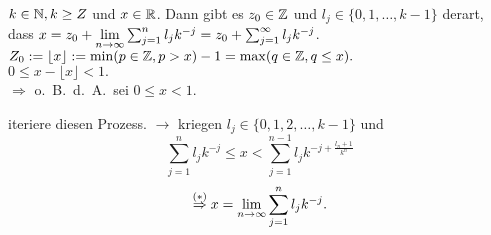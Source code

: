 \documentclass[../ana1.tex]{subfiles}
\begin{document}
\begin{satz}
	\(k\in\mathbb{N}, k\geq Z\) und \(x\in\mathbb{R} \). Dann gibt es \(z_0\in \mathbb{Z} \) und \(l_j \in \{0,1,\ldots,k-1\} \) derart, dass \(x = z_0 + \lim\limits_{n\rightarrow\infty} \sum_{j=1}^{n} l_j k^{-j} = z_0 + \sum_{j=1}^{\infty} l_j k^{-j} \).\\
	\(Z_0 := \lfloor x \rfloor := \min(p\in\mathbb{Z}, p>x) -1 = \max(q\in\mathbb{Z}, q\leq x). \) \\
	\( 0\leq x-\lfloor x\rfloor <1. \) \\
	\(\Rightarrow \) o.\ B.\ d.\ A.\ sei \(0\leq x<1\).
	\begin{center}
	\end{center}
	iteriere diesen Prozess.
	\(\rightarrow \) kriegen 
	\(l_j \in \{0,1,2,\ldots,k-1 \} \) 
	und 
	\[ \sum_{j=1}^{n} l_j k^{-j} 
	\leq x < \sum_{j=1}^{n-1} l_j k^{-j + \frac{l_n + 1}{k^n}} \tag{\(*\)}\]
	\[ \overset{(*)}{\Rightarrow} x = \lim\limits_{n\rightarrow\infty} \sum_{j=1}^{n} l_j k^{-j}. \]
\end{satz}
\end{document}
